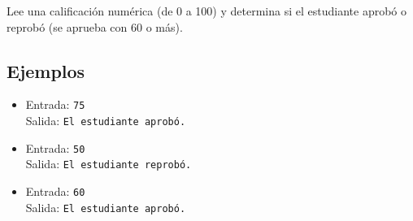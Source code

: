 Lee una calificación numérica (de 0 a 100) y determina si el estudiante aprobó o reprobó (se aprueba con 60 o más).
\subsection*{Ejemplos}
\begin{itemize}
    \item Entrada: \texttt{75}\\
          Salida: \texttt{El estudiante aprobó.}
    \item Entrada: \texttt{50}\\
          Salida: \texttt{El estudiante reprobó.}
    \item Entrada: \texttt{60}\\
          Salida: \texttt{El estudiante aprobó.}
\end{itemize}